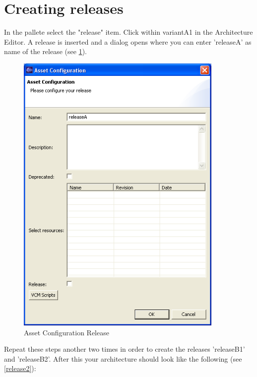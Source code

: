 \section{Creating releases}

In the pallete select the "release" item. Click within variantA1 in 
the Architecture Editor. A release is inserted and a dialog opens where you can enter 'releaseA' as name of
the release (see \ref{release1}). 

\begin{figure}[h!]
\begin{center}
\includegraphics[width=10cm]{tutorial11.png}
   \caption{Asset Configuration Release}
   \label{release1}
\end{center}
\end{figure}\par

Repeat these steps another two times in order to create the releases 'releaseB1' and 
'releaseB2'. After this your architecture should look like the following (see \ref{release2}):

